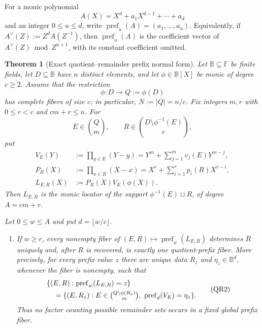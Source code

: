 \documentclass[11pt,a4paper]{amsart}
\numberwithin{equation}{section}
\newtheorem{theorem}{Theorem}[section]
\theoremstyle{remark}
\newcommand{\F}{\mathbb F}
\newcommand{\B}{\mathbb B}
\begin{document}
For a monic polynomial
\[
 A(X)=X^d+a_1X^{d-1}+\cdots+a_d
\]
and an integer $0\le u\le d$, write
\(\operatorname{pref}_u(A)=(a_1,\ldots,a_u)\).  Equivalently, if
\(A^\vee(Z):=Z^dA(Z^{-1})\), then
\(\operatorname{pref}_u(A)\) is the coefficient vector of
\(A^\vee(Z)\bmod Z^{u+1}\), with its constant coefficient omitted.

\begin{theorem}[Exact quotient--remainder prefix normal form]
\label{thm:exact-quotient-remainder-normal-form}
Let $\B\subseteq\F$ be finite fields, let $D\subseteq\B$ have $n$
distinct elements, and let $\phi\in\B[X]$ be monic of degree $c\ge2$.
Assume that the restriction
\[
             \phi:D\longrightarrow Q:=\phi(D)
\]
has complete fibers of size $c$; in particular, $N:=|Q|=n/c$.
Fix integers $m,r$ with $0\le r<c$ and $cm+r\le n$.  For
\[
 E\in\binom Qm,
 \qquad
 R\in\binom{D\setminus\phi^{-1}(E)}r,
\]
put
\[
 \begin{split}
 V_E(Y)&:=\prod_{y\in E}(Y-y)
       =Y^m+\sum_{j=1}^m v_j(E)Y^{m-j},\\
 P_R(X)&:=\prod_{x\in R}(X-x)
       =X^r+\sum_{i=1}^r p_i(R)X^{r-i},\\
 L_{E,R}(X)&:=P_R(X)V_E(\phi(X)).
 \end{split}                                      \tag{QR1}\label{eq:qr-locators}
\]
Then $L_{E,R}$ is the monic locator of the support
\(\phi^{-1}(E)\sqcup R\), of degree $A=cm+r$.

Let $0\le w\le A$ and put $d=\lfloor w/c\rfloor$.

\begin{enumerate}[label=\textup{(\roman*)},leftmargin=*]
\item If $w\ge r$, every nonempty fiber of
      \((E,R)\mapsto\operatorname{pref}_w(L_{E,R})\) determines $R$
      uniquely and, after $R$ is recovered, is exactly one quotient-prefix
      fiber.  More precisely, for every prefix value $z$ there are unique
      data $R_z$ and $\eta_z\in\B^d$, whenever the fiber is nonempty, such
      that
      \[
      \begin{split}
       &\{(E,R):\operatorname{pref}_w(L_{E,R})=z\}\\
       &\quad=
       \{(E,R_z): E\in\tbinom{Q\setminus\phi(R_z)}m,
           \ \operatorname{pref}_d(V_E)=\eta_z\}.
      \end{split}                                  \tag{QR2}\label{eq:qr-fiber-exact}
      \]
      Thus no factor counting possible remainder sets occurs in a fixed
      global prefix fiber.


\end{enumerate}
\end{theorem}
\end{document}

